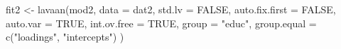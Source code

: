 \begin{Schunk}
\begin{Sinput}
 fit2 <- lavaan(mod2,
                data = dat2,
                std.lv = FALSE,
                auto.fix.first = FALSE,
                auto.var = TRUE,
                int.ov.free = TRUE,
                group = "educ",
                group.equal = c("loadings", "intercepts")
                )
\end{Sinput}
\end{Schunk}
